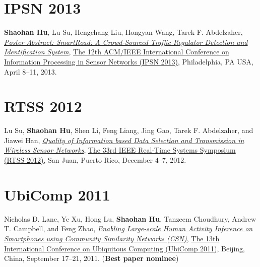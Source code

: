 \section{\sc IPSN 2013}\hypertarget{hu2013ipsn}{}
\textbf{Shaohan Hu}, Lu Su, Hengchang Liu, Hongyan Wang, Tarek F. Abdelzaher,
\href{http://portal.acm.org/citation.cfm?id=2461433}{\emph{Poster Abstract: SmartRoad: A Crowd-Sourced Traffic Regulator Detection and Identification System}},
\href{http://ipsn.acm.org/2013/}{\textsf{The 12th ACM/IEEE International Conference on Information Processing in Sensor Networks (IPSN 2013)}},
Philadelphia, PA USA, April 8--11, 2013.


\section{\sc RTSS 2012}\hypertarget{su2012rtss}{}
Lu Su, \textbf{Shaohan Hu}, Shen Li, Feng Liang, Jing Gao, Tarek F. Abdelzaher, and Jiawei Han,
\href{http://ieeexplore.ieee.org/document/6424815}{\emph{Quality of Information based Data Selection and Transmission in Wireless Sensor Networks}},
\href{http://sites.ieee.org/rtss2012/}{\textsf{The 33rd IEEE Real-Time Systems Symposium (RTSS 2012)}},
San Juan, Puerto Rico, December 4--7, 2012.

\section{\sc UbiComp 2011}\hypertarget{lane2011ubicomp}{}
Nicholas D. Lane, Ye Xu, Hong Lu, \textbf{Shaohan Hu}, Tanzeem Choudhury, Andrew T. Campbell, and Feng Zhao,
\href{http://portal.acm.org/citation.cfm?id=2030160}{\emph{Enabling Large-scale Human Activity Inference on Smartphones using Community Similarity Networks (CSN)}},
\href{http://www.ubicomp.org/ubicomp2011/}{\textsf{The 13th International Conference on Ubiquitous Computing (UbiComp 2011)}},
Beijing, China, September 17--21, 2011. (\textbf{Best paper nominee})

